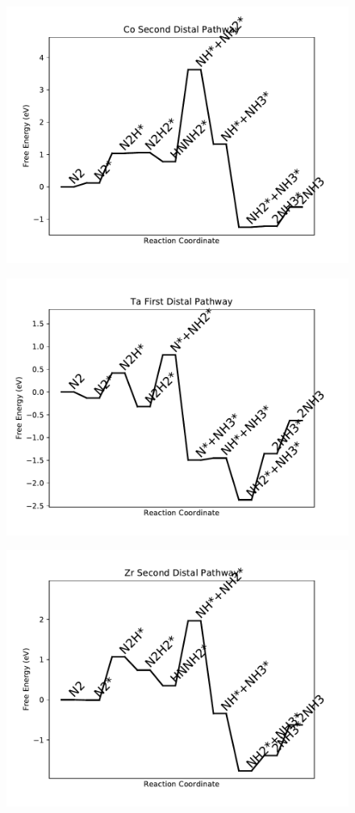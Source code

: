 \begin{figure}
\includegraphics[width=0.8\linewidth]{data/plots/Co_distal_2.pdf}
\label{fig:Co_distal_2}
\end{figure}

\begin{figure}
\includegraphics[width=0.8\linewidth]{data/plots/Ta_distal_1.pdf}
\label{fig:Ta_distal_1}
\end{figure}

\begin{figure}
\includegraphics[width=0.8\linewidth]{data/plots/Zr_distal_2.pdf}
\label{fig:Zr_distal_2}
\end{figure}

